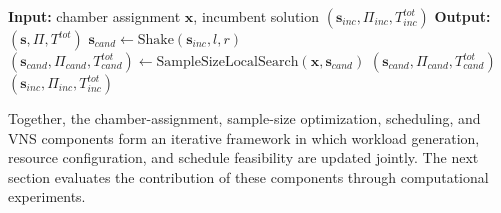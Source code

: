 \begin{algorithm}[H]
\caption{VNS}
\label{alg:vns}
\label{alg:vns_fixed_destroy}
\label{alg:vns_short}
\begin{algorithmic}[1]
\State \textbf{Input:} chamber assignment \(\mathbf{x}\), incumbent solution \((\mathbf{s}_{inc},\Pi_{inc},T^{tot}_{inc})\)
\State \textbf{Output:} \((\mathbf{s},\Pi,T^{tot})\)
         \label{VNS:step1}
            \State \(\mathbf{s}_{cand}\leftarrow\mathrm{Shake}(\mathbf{s}_{inc},l,r)\) \label{VNS:step2}
            \State \((\mathbf{s}_{cand},\Pi_{cand},T^{tot}_{cand})\leftarrow\mathrm{SampleSizeLocalSearch}(\mathbf{x},\mathbf{s}_{cand})\)
                \State \Return \((\mathbf{s}_{cand},\Pi_{cand},T^{tot}_{cand})\)
            \EndIf
        \EndFor \label{VNS:step7}
    \EndFor
\EndFor
\State \Return \((\mathbf{s}_{inc},\Pi_{inc},T^{tot}_{inc})\)
\end{algorithmic}
\end{algorithm}

Together, the chamber-assignment, sample-size optimization, scheduling, and VNS components form an iterative framework in which workload generation, resource configuration, and schedule feasibility are updated jointly. The next section evaluates the contribution of these components through computational experiments.
